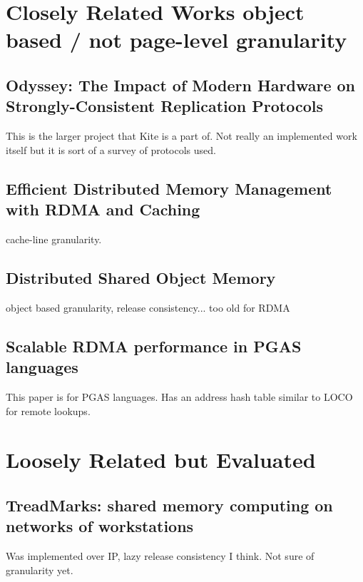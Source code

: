 \documentclass[sigplan,nonacm]{acmart}
\begin{document}

\section{Closely Related Works object based / not page-level granularity}

    \subsection {Odyssey: The Impact of Modern Hardware on Strongly-Consistent Replication Protocols} %
    This is the larger project that Kite is a part of. Not really an implemented work itself but it is sort of 
    a survey of protocols used.\cite{Gavrielatos-EuroSys-2021}

    \subsection{Efficient Distributed Memory Management with RDMA and Caching } %
    cache-line granularity.\cite{Cai-VLDB-2018} 

    \subsection{Distributed Shared Object Memory}%
    object based granularity, release consistency... too old for RDMA\cite{Guedes-WWOSIII-1993}

    \subsection{Scalable RDMA performance in PGAS languages}
    This paper is for PGAS languages. Has an address hash table similar to LOCO for remote lookups.\cite{Farreras-IPDPS-2009}

\section{Loosely Related but Evaluated}
\subsection{TreadMarks: shared memory computing on networks of workstations}
Was implemented over IP, lazy release consistency I think. Not sure of granularity yet.\cite{Amza-Usenix-1994}
\end{document}
